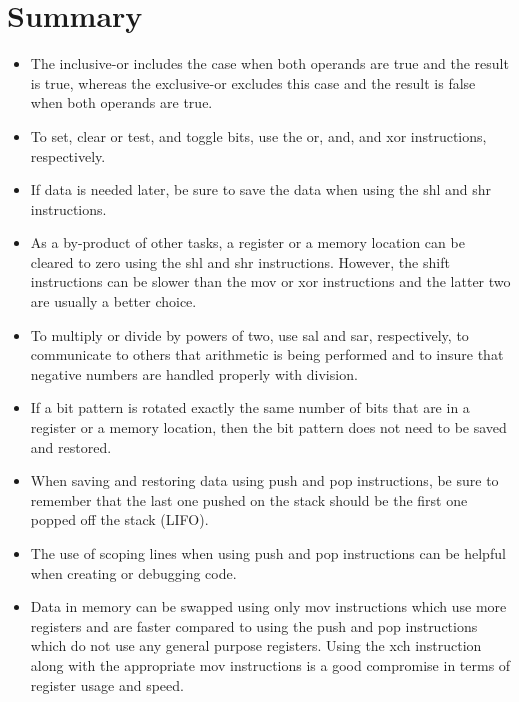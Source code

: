 \documentclass[10pt]{book}
\begin{document}
\section{Summary}
\begin{itemize}
  \item The inclusive-or includes the case when both operands are true and the result is true, whereas the exclusive-or excludes this case and the result is false when both operands are true.
  \item To set, clear or test, and toggle bits, use the or, and, and xor instructions, respectively.
  \item If data is needed later, be sure to save the data when using the shl and shr instructions.
  \item As a by-product of other tasks, a register or a memory location can be cleared to zero using the shl and shr instructions. However, the shift instructions can be slower than the mov or xor instructions and the latter two are usually a better choice.
  \item To multiply or divide by powers of two, use sal and sar, respectively, to communicate to others that arithmetic is being performed and to insure that negative numbers are handled properly with division.
  \item If a bit pattern is rotated exactly the same number of bits that are in a register or a memory location, then the bit pattern does not need to be saved and restored.
  \item When saving and restoring data using push and pop instructions, be sure to remember that the last one pushed on the stack should be the first one popped off the stack (LIFO).
  \item The use of scoping lines when using push and pop instructions can be helpful when creating or debugging code.
  \item Data in memory can be swapped using only mov instructions which use more registers and are faster compared to using the push and pop instructions which do not use any general purpose registers. Using the xch instruction along with the appropriate mov instructions is a good compromise in terms of register usage and speed.
\end{itemize}
\end{document}
